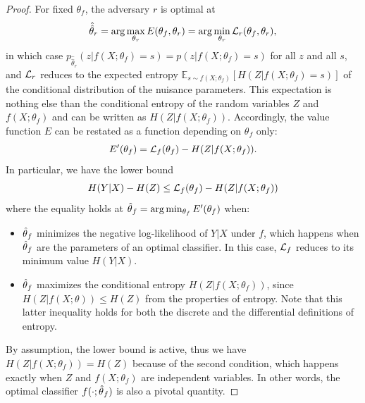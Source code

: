 \documentclass{article}
\theoremstyle{plain}
\begin{document}
\begin{proof}

For fixed $\theta_f$, the adversary $r$ is optimal at
\begin{equation}
    \hat{\hat\theta}_r = \arg \max_{\theta_r} E(\theta_f, \theta_r)  = \arg \min_{\theta_r} {\cal L}_r(\theta_f, \theta_r),
\end{equation}
in which case $p_{\hat{\hat\theta}_r}(z|f(X;\theta_f)=s) =
p(z|f(X;\theta_f)=s)$ for all $z$ and all $s$, and ${\cal L}_r$ reduces to the expected entropy
$\mathbb{E}_{s \sim f(X;\theta_f)} [ H({Z|f(X;\theta_f)=s}) ]$ of the conditional distribution of the nuisance parameters.
This expectation is nothing else than the conditional entropy of the random variables
$Z$ and $f(X;\theta_f)$ and can be written as $H(Z|f(X;\theta_f))$.
Accordingly, the
value function $E$ can be restated as a function depending on $\theta_f$ only:
\begin{equation}
    E'(\theta_f) = {\cal L}_f(\theta_f) -  H({Z|f(X;\theta_f)}).
\end{equation}
In particular, we have the lower bound
\begin{equation}
    H({Y|X}) - H(Z) \leq {\cal L}_f(\theta_f) - H({Z|f(X;\theta_f)})
\end{equation}
where the equality holds at $\smash{\hat\theta}_f = \arg \min_{\theta_f}
E'(\theta_f)$  when:
\begin{itemize}
    \item $\smash{\hat\theta}_f$ minimizes the negative log-likelihood of $Y|X$ under $f$,
    which happens when $\smash{\hat\theta}_f$ are the parameters
    of an optimal classifier. In this case, ${\cal L}_f$ reduces to its
    minimum value $H({Y|X})$.

    \item $\smash{\hat\theta}_f$ maximizes the conditional entropy
    $H({Z|f(X;\theta_f)})$, since $H(Z|f(X;\theta)) \leq H(Z)$ from the properties of entropy. Note that this
    latter inequality holds for both the discrete and the differential definitions of entropy.
\end{itemize}
By assumption, the lower bound is active, thus we have $H(Z|f(X;\theta_f)) = H(Z)$
because of the second condition, which happens exactly when $Z$ and $f(X;\theta_f)$
are independent variables. In other words,  the
optimal classifier $f(\cdot;\smash{\hat\theta}_f)$ is also a pivotal
quantity.

\end{proof}
\end{document}
